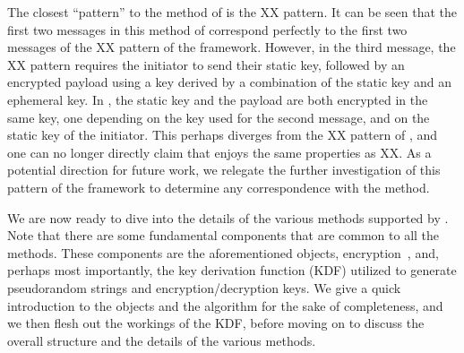 {The closest \mNoise{} ``pattern'' to the \mStatStat{} method of \mEdhoc{} is the
XX pattern. It can be seen that the first two messages in this method of
\mEdhoc{} correspond perfectly to the first two messages of the XX pattern of
the \mNoise{} framework. However, in the third message, the XX pattern requires
the initiator to send their static key, followed by an encrypted payload using a
key derived by a combination of the static key and an ephemeral key. In
\mEdhoc{}, the static key and the payload are both encrypted in the same key, one depending on the key used for the second message, and on the static key of the initiator.
This perhaps diverges from the XX pattern of \mNoise{}, and one can no longer
directly claim that \mEdhoc{} enjoys the same properties as XX. As a potential
direction for future work, we relegate the further investigation of this pattern
of the \mNoise{} framework to {determine any} correspondence with the
\mStatStat{} method.

\iffalse %
\subsection{Framework}
\label{sec:edhocFramework}
\knote{I re-read the Noise spec. There are a lot more similarities to \mEdhoc{}
    than I understood earlier. For instance the idea of overlaying two protocols
    is already in \mNoise. Also the \mPskPsk{}-method may also be mapping
    a PSK-pattern in \mNoise. This section will describe the \mEdhoc{} framework
    because it helps frame the detailed descriptions of the methods that follow.
    I plan to also point out more similarities to \mNoise{} at the same time.
}
\fi %
We are now ready to dive into the details of the various methods supported by
\mEdhoc. Note that there are some fundamental components that are common to all
the \mEdhoc methods. These components are the aforementioned \mCose{} objects,
\mAead{} encryption~\cite{aead}, and, perhaps most importantly, the key
derivation function (KDF) utilized to generate pseudorandom strings and
encryption/decryption keys. We give a quick introduction to the \mCose{} objects and the \mAead{} algorithm for the sake of completeness, and we then flesh out the workings of the KDF, before moving on to discuss the {overall structure and the details of the various} methods.

}
